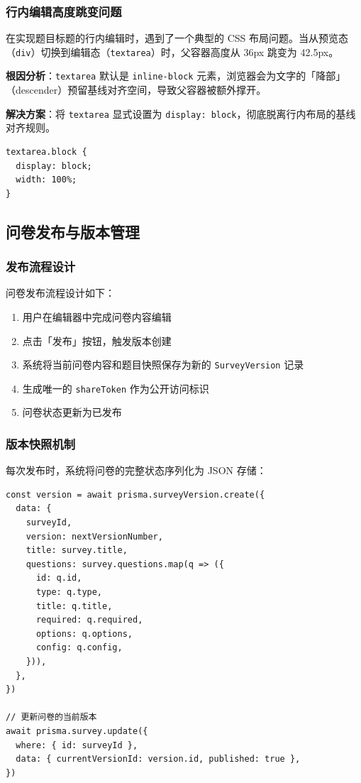 \subsubsection{行内编辑高度跳变问题}

在实现题目标题的行内编辑时，遇到了一个典型的 CSS 布局问题。当从预览态（\texttt{div}）切换到编辑态（\texttt{textarea}）时，父容器高度从 36px 跳变为 42.5px。

\textbf{根因分析}：\texttt{textarea} 默认是 \texttt{inline-block} 元素，浏览器会为文字的「降部」（descender）预留基线对齐空间，导致父容器被额外撑开。

\textbf{解决方案}：将 \texttt{textarea} 显式设置为 \texttt{display: block}，彻底脱离行内布局的基线对齐规则。

\begin{verbatim}
textarea.block {
  display: block;
  width: 100%;
}
\end{verbatim}

\subsection{问卷发布与版本管理}

\subsubsection{发布流程设计}

问卷发布流程设计如下：

\begin{enumerate}[label=\textbf{\arabic*.}]
  \item 用户在编辑器中完成问卷内容编辑
  \item 点击「发布」按钮，触发版本创建
  \item 系统将当前问卷内容和题目快照保存为新的 \texttt{SurveyVersion} 记录
  \item 生成唯一的 \texttt{shareToken} 作为公开访问标识
  \item 问卷状态更新为已发布
\end{enumerate}

\subsubsection{版本快照机制}

每次发布时，系统将问卷的完整状态序列化为 JSON 存储：

\begin{verbatim}
const version = await prisma.surveyVersion.create({
  data: {
    surveyId,
    version: nextVersionNumber,
    title: survey.title,
    questions: survey.questions.map(q => ({
      id: q.id,
      type: q.type,
      title: q.title,
      required: q.required,
      options: q.options,
      config: q.config,
    })),
  },
})

// 更新问卷的当前版本
await prisma.survey.update({
  where: { id: surveyId },
  data: { currentVersionId: version.id, published: true },
})
\end{verbatim}

